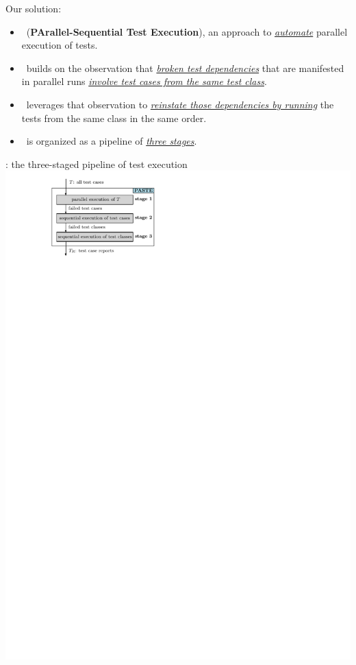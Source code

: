 \documentclass{beamer}
\begin{document}
\begin{frame}{Our solution: \tname{}}
\begin{itemize}
\item{\textbf{\tname}~({\rsm \textbf{PArallel-Sequential Test Execution}}), an approach to \textit{\rsm \underline{automate}} parallel execution of tests.}\pause
\item{\tname\ builds on the observation that {\rsm \textit{\underline{broken test dependencies}}} that are manifested in parallel runs {\rsm \textit{\underline{involve test cases from the same test class}}}.}\pause
\item{\tname\ leverages that observation to \textit{\rsm \underline{reinstate those dependencies by running}} the tests from the same class in the same order.}\pause
\item{\tname\ is organized as a pipeline of \textit{\underline{three stages}}.}
\end{itemize} 
\end{frame}

\begin{frame}{\tname{}: the three-staged pipeline of test execution}
	\centering 
	\includegraphics[width=0.8\linewidth]{images/soundy.pdf}
\end{frame}
\end{document}
